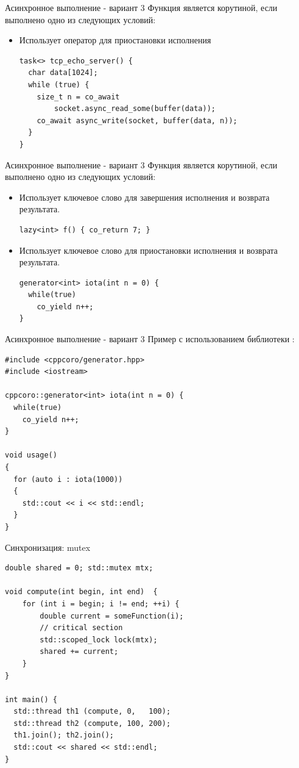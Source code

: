\documentclass{beamer}
\begin{document}
\begin{frame}[fragile]{Асинхронное выполнение - вариант 3}
Функция является корутиной, если выполнено одно из следующих условий:
\begin{itemize}
    \item Использует оператор  для приостановки исполнения
    \begin{lstlisting}
task<> tcp_echo_server() {
  char data[1024];
  while (true) {
    size_t n = co_await 
        socket.async_read_some(buffer(data));
    co_await async_write(socket, buffer(data, n));
  }
}
    \end{lstlisting}
\end{itemize}
\end{frame}

\begin{frame}[fragile]{Асинхронное выполнение - вариант 3}
Функция является корутиной, если выполнено одно из следующих условий:
\begin{itemize}
    \item Использует ключевое слово  для завершения исполнения и возврата результата.
    \begin{lstlisting}
lazy<int> f() { co_return 7; }
    \end{lstlisting}
    \item Использует ключевое слово  для приостановки исполнения и возврата результата.
    \begin{lstlisting}
generator<int> iota(int n = 0) {
  while(true)
    co_yield n++;
}
    \end{lstlisting}
\end{itemize}
\end{frame}

\begin{frame}[fragile]{Асинхронное выполнение - вариант 3}
Пример с использованием библиотеки :
    \begin{lstlisting}
#include <cppcoro/generator.hpp>
#include <iostream>

cppcoro::generator<int> iota(int n = 0) {
  while(true)
    co_yield n++;
}

void usage()
{
  for (auto i : iota(1000))
  {
    std::cout << i << std::endl;
  }
}
    \end{lstlisting}
\end{frame}

\begin{frame}[fragile]{Синхронизация: mutex}
    \begin{lstlisting}
double shared = 0; std::mutex mtx;

void compute(int begin, int end)  {
    for (int i = begin; i != end; ++i) {
        double current = someFunction(i);        
        // critical section
        std::scoped_lock lock(mtx);
        shared += current;        
    }
}

int main() {
  std::thread th1 (compute, 0,   100);
  std::thread th2 (compute, 100, 200);
  th1.join(); th2.join();
  std::cout << shared << std::endl;
}
\end{lstlisting}
\end{frame}
\end{document}
